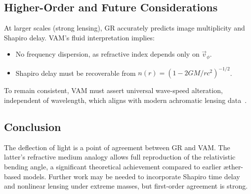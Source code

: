 \subsection*{Higher-Order and Future Considerations}
At larger scales (strong lensing), GR accurately predicts image multiplicity and Shapiro delay. VAM's fluid interpretation implies:
\begin{itemize}
    \item No frequency dispersion, as refractive index depends only on $\vec{v}_\phi$.
    \item Shapiro delay must be recoverable from $n(r) = (1 - 2GM/rc^2)^{-1/2}$.
\end{itemize}
To remain consistent, VAM must assert universal wave-speed alteration, independent of wavelength, which aligns with modern achromatic lensing data~\cite{eubanks1997vla,shapiro2004gravitational}.

\subsection*{Conclusion}
The deflection of light is a point of agreement between GR and VAM. The latter's refractive medium analogy allows full reproduction of the relativistic bending angle, a significant theoretical achievement compared to earlier æther-based models. Further work may be needed to incorporate Shapiro time delay and nonlinear lensing under extreme masses, but first-order agreement is strong.
